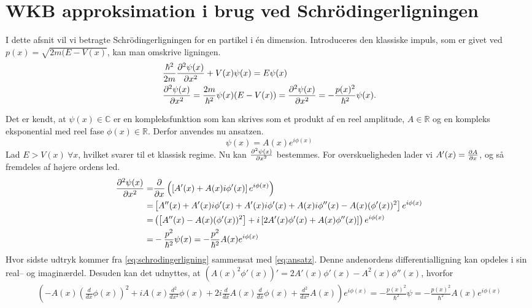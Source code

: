 \section{WKB approksimation i brug ved Schrödingerligningen}
I dette afsnit vil vi betragte Schrödingerligningen for en partikel i én dimension. Introduceres den klassiske impuls, som er givet ved $p(x) = \sqrt{2m(E-V(x)}$, kan man omskrive ligningen.
%
\begin{align}
    & \frac{\hbar^2}{2m} \pdiff[2]{\psi(x)}{x} + V(x)\psi(x) = E\psi(x) \\
    & \pdiff[2]{\psi(x)}{x} = \frac{2m}{\hbar^2}\psi(x)(E - V(x))  = \pdiff[2]{\psi(x)}{x} = - \frac{p(x)^2}{\hbar^2}\psi(x).
    \label{eq:schrodingerligning}
\end{align}

Det er kendt, at $\psi(x) \in \mathbb{C}$ er en kompleksfunktion som kan skrives som et produkt af en reel amplitude, $A \in \mathbb{R}$ og en kompleks eksponential med reel fase $\phi(x)\in \mathbb{R}$. Derfor anvendes nu ansatzen.
\begin{equation}
    \psi(x) = A(x) e^{i \phi(x)}
    \label{eq:ansatz}
\end{equation}
Lad $E > V(x) \ \forall x$, hvilket svarer til et klassisk regime.
Nu kan $\pdiff[2]{\psi(x)}{x}$ bestemmes. For overskueligheden lader vi $A'(x) = \pdiff{A}{x}$, og så fremdeles af højere ordens led.
\begin{align}
    \pdiff[2]{\psi(x)}{x} = & \pdiff{}{x}\left( \left[ A'(x) + A(x)i\phi'(x) \right]e^{i\phi(x)} \right) \\
    = & \left[ A''(x) + A'(x)i\phi'(x) + A'(x)i\phi'(x) + A(x)i\phi''(x) - A(x)( \phi'(x))^2\right]e^{i\phi(x)} \\
    = & \left(\left[ A''(x) - A(x)(\phi'(x))^2\right] + i \left[2A'(x)\phi'(x) + A(x)\phi''(x) \right]\right)e^{i\phi(x)}\\
    = & -\frac{p^2}{\hbar^2}\psi(x) = -\frac{p^2}{\hbar^2} A(x)e^{i\phi(x)}
    \label{eq:regime}
\end{align}
Hvor sidste udtryk kommer fra \cref{eq:schrodingerligning} sammensat med \cref{eq:ansatz}.
Denne andenordens differentialligning kan opdeles i sin real-- og imaginærdel. Desuden kan det udnyttes, at $\left( A(x)^2\phi'(x) \right)' = 2A'(x)\phi'(x) - A^2(x)\phi''(x)$, hvorfor
\begin{align}
    \left(- A{\left (x \right )} \left(\frac{d}{d x} \phi{\left (x \right )}\right)^{2} + i A{\left (x \right )} \frac{d^{2}}{d x^{2}}  \phi{\left (x \right )} + 2 i \frac{d}{d x} A{\left (x \right )} \frac{d}{d x} \phi{\left (x \right )} + \frac{d^{2}}{d x^{2}}  A{\left (x \right )}\right) e^{i \phi{\left (x \right )}} = - \frac{p(x)^2}{\hbar^2} \psi = - \frac{p(x)^2}{\hbar^2} A(x) e^{i \phi(x)}
    \label{eq:udskrevet}
\end{align}

